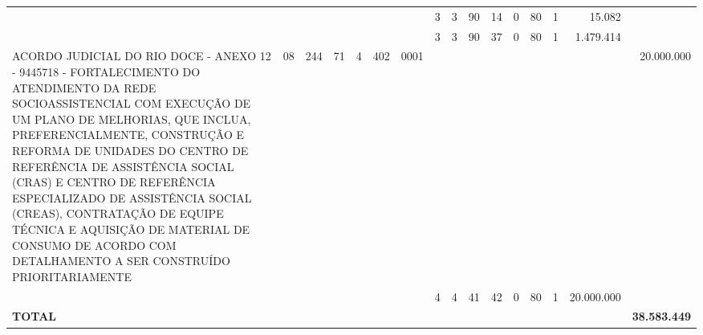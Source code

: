 \documentclass{article}
\begin{document}
\begin{longtable}[c]{m{6.5cm}|m{1pt}m{1pt}m{1pt}m{1pt}m{1pt}m{1pt}|m{1pt}m{1pt}m{0.5pt}m{1pt}|m{1pt}|m{1pt}m{1pt}|m{1pt}|m{2pt}}
& & & & & & & \multicolumn{1}{c}{ 3 } & \multicolumn{1}{c}{ 3 } & \multicolumn{1}{c}{ 90 } & \multicolumn{1}{c|}{ 14 } & \multicolumn{1}{c|}{ 0 } & \multicolumn{1}{l}{ 80 } & \multicolumn{1}{c|}{ 1 } & \multicolumn{1}{r|}{ 15.082 } & \\
& & & & & & & \multicolumn{1}{c}{ 3 } & \multicolumn{1}{c}{ 3 } & \multicolumn{1}{c}{ 90 } & \multicolumn{1}{c|}{ 37 } & \multicolumn{1}{c|}{ 0 } & \multicolumn{1}{l}{ 80 } & \multicolumn{1}{c|}{ 1 } & \multicolumn{1}{r|}{ 1.479.414 } & \\
\multicolumn{1}{L{5.5cm}|}{ ACORDO JUDICIAL DO RIO DOCE - ANEXO 12 - 9445718 - FORTALECIMENTO DO ATENDIMENTO DA REDE SOCIOASSISTENCIAL COM EXECUÇÃO DE UM PLANO DE MELHORIAS, QUE INCLUA, PREFERENCIALMENTE, CONSTRUÇÃO E REFORMA DE UNIDADES DO CENTRO DE REFERÊNCIA DE ASSISTÊNCIA SOCIAL (CRAS) E CENTRO DE REFERÊNCIA ESPECIALIZADO DE ASSISTÊNCIA SOCIAL (CREAS), CONTRATAÇÃO DE EQUIPE TÉCNICA E AQUISIÇÃO DE MATERIAL DE CONSUMO DE ACORDO COM DETALHAMENTO A SER CONSTRUÍDO PRIORITARIAMENTE } & \multicolumn{1}{c}{ 08 } & \multicolumn{1}{c}{ 244 } & \multicolumn{1}{c}{ 71 } & \multicolumn{1}{l}{ 4 } & \multicolumn{1}{c}{ 402 } & \multicolumn{1}{l|}{ 0001 } & & & & & & & & & \multicolumn{1}{r}{ 20.000.000 } \\
& & & & & & & \multicolumn{1}{c}{ 4 } & \multicolumn{1}{c}{ 4 } & \multicolumn{1}{c}{ 41 } & \multicolumn{1}{c|}{ 42 } & \multicolumn{1}{c|}{ 0 } & \multicolumn{1}{l}{ 80 } & \multicolumn{1}{c|}{ 1 } & \multicolumn{1}{r|}{ 20.000.000 } & \\
\hline
\multicolumn{15}{C{6cm}|}{\textbf{ TOTAL }} & \multicolumn{1}{r}{\textbf{ 38.583.449 }} \\
\end{longtable}
\newpage
{}
{}
\renewcommand*{\arraystretch}{1.9}
\scriptsize
\color{myblack}
\centering
\end{document}

